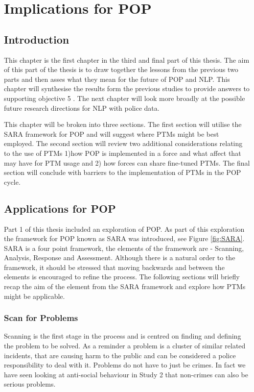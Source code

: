 \chapter{Implications for POP}


\section{Introduction} This chapter is the first chapter in the third and final part of this thesis. The aim of this part of the thesis is to draw together the lessons from the previous two parts and then asses what they mean for the future of POP and NLP.  This chapter will synthesise the results form the previous studies to provide answers to supporting objective 5  . The next chapter will look more broadly at the possible future research directions for NLP with police data.

This chapter will be broken into three sections. The first section will utilise the SARA framework for POP and  will suggest where PTMs might be best employed. The second section will review two additional considerations relating to the use of PTMs 1)how POP is implemented in a force and what affect that may have for PTM usage and 2) how forces can share fine-tuned PTMs. The final section will conclude with barriers to the implementation of PTMs in the POP cycle.


\section{Applications for POP} Part 1 of this thesis included an exploration of POP. As part of this exploration the framework for POP known as SARA was introduced, see Figure \ref{fig:SARA}. SARA is a four point framework, the elements of the framework are - Scanning, Analysis, Response and Assessment.  Although there is a natural order to the framework, it should be stressed that moving backwards and between the elements is encouraged to refine the process.  The following sections will briefly recap the aim of the element from the SARA framework and explore how PTMs might be applicable.

\subsection{Scan for Problems} Scanning is the first stage in the process and is centred on finding and defining the problem to be solved. As a reminder a problem is a cluster of similar related incidents, that are causing harm to the public and can be considered a police responsibility to deal with it. Problems do not have to just be crimes. In fact we have seen looking at anti-social behaviour in Study 2 that non-crimes can also be serious problems. 

